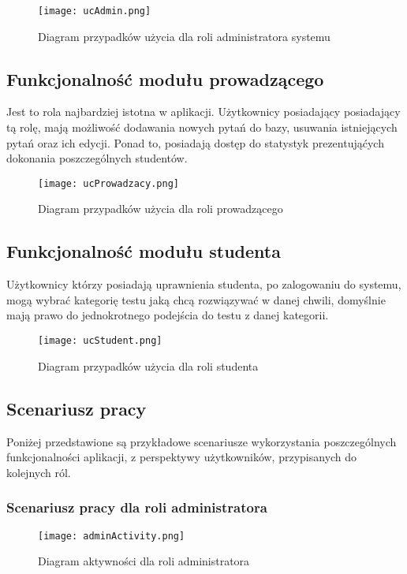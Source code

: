 \documentclass[a4paper, titlepage]{article}
\begin{document}
\begin{figure}[H]
      \centering
      \texttt{[image: ucAdmin.png]}
      \caption{Diagram przypadków użycia dla roli administratora systemu}
  \end{figure}

\subsection{Funkcjonalność modułu prowadzącego}
	Jest to rola najbardziej istotna w aplikacji. Użytkownicy posiadający posiadający tą rolę, mają możliwość dodawania nowych pytań do bazy, usuwania istniejących pytań oraz ich edycji. Ponad to, posiadają dostęp do statystyk prezentująćych dokonania poszczególnych studentów. 

  \begin{figure}[H]
      \centering
      \texttt{[image: ucProwadzacy.png]}
      \caption{Diagram przypadków użycia dla roli prowadzącego}
  \end{figure}

\subsection{Funkcjonalność modułu studenta}
	Użytkownicy którzy posiadają uprawnienia studenta, po zalogowaniu do systemu, mogą wybrać kategorię testu jaką chcą rozwiązywać w danej chwili, domyślnie mają prawo do jednokrotnego podejścia do testu z danej kategorii.
    
       \begin{figure}[H]
      \centering
      \texttt{[image: ucStudent.png]}
      \caption{Diagram przypadków użycia dla roli studenta}
  \end{figure}
    
    
\subsection{Scenariusz pracy}
Poniżej przedstawione są przykładowe scenariusze wykorzystania poszczególnych funkcjonalności aplikacji, z perspektywy użytkowników, przypisanych do kolejnych ról.

\subsubsection{Scenariusz pracy dla roli administratora}

\begin{figure}[H]
      \centering
      \texttt{[image: adminActivity.png]}
      \caption{Diagram aktywności dla roli administratora}
  \end{figure}
\end{document}
